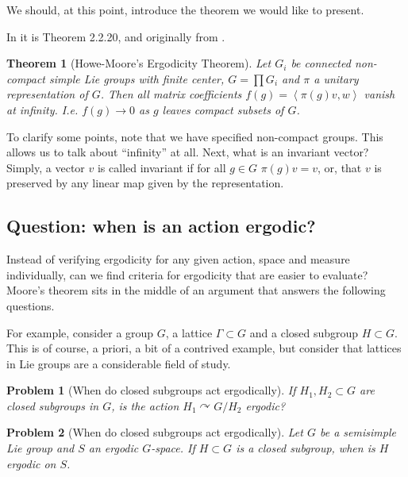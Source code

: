 \documentclass[
  12pt
]{article}
\numberwithin{equation}{section}
\newtheorem{thm}{Theorem}[section]
\newtheorem*{problem}{Problem}
\theoremstyle{plain}
\newcommand{\G}{\ensuremath{G}\xspace}
\newcommand{\inn}[1]{\left\langle #1 \right\rangle}
\begin{document}
  We should, at this point, introduce the theorem we would like to present.

  In \citeauthor{Zimmer84}\cite{Zimmer84} it is Theorem 2.2.20, and originally from \citeauthor{howe79}\cite{howe79}.

  \begin{thm}[Howe-Moore's Ergodicity Theorem]
    \label{thm:main-thm}
    Let $G_i$ be connected non-compact simple Lie groups with finite center, $G = \prod G_i$ and $\pi$ a unitary representation of \G.
    Then all matrix coefficients $f(g) = \inn{\pi(g)v,w}$ vanish at infinity.
    I.e. $f(g) \rightarrow 0$ as $g$ leaves compact subsets of \G.
  \end{thm}

  To clarify some points, note that we have specified non-compact groups.
  This allows us to talk about ``infinity'' at all. Next, what is an
  invariant vector? Simply, a vector $v$ is called invariant if for all $g\in G$
  $\pi(g)v = v$, or, that $v$ is preserved by any linear map
  given by the representation.

  \hypertarget{question-when-is-an-action-ergodic}{%
  \subsection{Question: when is an action
  ergodic?}\label{question-when-is-an-action-ergodic}}

  Instead of verifying ergodicity for any given action, space and measure
  individually, can we find criteria for ergodicity that are easier to
  evaluate? Moore's theorem sits in the middle of an argument that
  answers the following questions.

  For example, consider a group \G, a lattice $\Gamma \subset G$ and a closed subgroup $H \subset G$.
  This is of course, a priori, a bit of a contrived example, but consider that lattices in Lie groups are a considerable field of study.

  \begin{problem}[When do closed subgroups act ergodically]
    If $H_1, H_2 \subset G$ are closed subgroups in \G, is the action $H_1\curvearrowright G/H_2$ ergodic?
  \end{problem}

  \begin{problem}[When do closed subgroups act ergodically]
    Let \G be a semisimple Lie group and $S$ an ergodic \G-space. If $H\subset G$ is a closed subgroup, when is $H$ ergodic on $S$.
  \end{problem}
\end{document}
